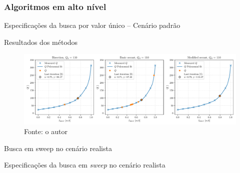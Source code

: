 \subsubsection{Algoritmos em alto nível}

\begin{frame}{Especificações da busca por valor único -- Cenário padrão}
    \begin{table}[H]
        \centering
        \caption{Especificações do teste de busca por valor único}
        
        \label{tab-spec-single}
        \caption*{Fonte: o autor}
    \end{table}
    
\end{frame}

\begin{frame}{Resultados dos métodos}

\begin{figure}[H]
    \centering
    \caption{Pontos obtidos por iteração e curva $Q \times I_{REF}$ dos métodos de busca em alto nível}
    \includegraphics{fig/res-methods-single.pdf}
    \caption*{Fonte: o autor}
    \label{f-res-single}
\end{figure}
    
\end{frame}

\begin{frame}[standout]

Busca em sweep no cenário realista
    
\end{frame}

\begin{frame}{Especificações da busca em \textit{sweep} no cenário realista}
    
\begin{table}[H]
    \centering
    \caption{Especificações do teste de busca em \textit{sweep}}
    
     \caption*{Fonte: o autor}
    \label{tab-spec-sweep}
\end{table}

\end{frame}

